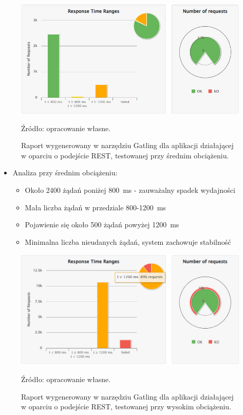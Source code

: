\documentclass[runningheads,12pt]{llncs}
\begin{document}
\newpage

\begin{figure}
    \includegraphics[width=\linewidth]{images/rest-gatling-middle-rest.jpg}
    \caption{Raport wygenerowany w narzędziu Gatling dla aplikacji działającej w oparciu o podejście REST, testowanej przy średnim obciążeniu.} \label{fig2}
    \vspace{0.5em}
    {\small Źródło: opracowanie własne.}
\end{figure}

\begin{itemize}
  \item Analiza przy średnim obciążeniu:
  \begin{itemize}
    \item Około 2400 żądań poniżej 800~ms - zauważalny spadek wydajności
    \item Mała liczba żądań w przedziale 800-1200~ms
    \item Pojawienie się około 500 żądań powyżej 1200~ms
    \item Minimalna liczba nieudanych żądań, system zachowuje stabilność
  \end{itemize}
\end{itemize}

\newpage

\begin{figure}
    \includegraphics[width=\linewidth]{images/rest-gatling-high-graph.jpg}
    \caption{Raport wygenerowany w narzędziu Gatling dla aplikacji działającej w oparciu o podejście REST, testowanej przy wysokim obciążeniu.} \label{fig3}
    \vspace{0.5em}
    {\small Źródło: opracowanie własne.}
\end{figure}
\end{document}
